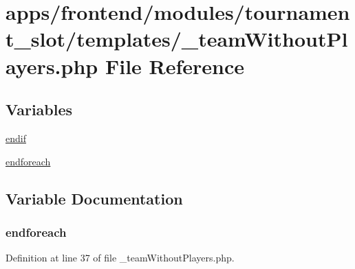 \hypertarget{frontend_2modules_2tournament__slot_2templates_2__team_without_players_8php}{\section{apps/frontend/modules/tournament\-\_\-slot/templates/\-\_\-team\-Without\-Players.php File Reference}
\label{frontend_2modules_2tournament__slot_2templates_2__team_without_players_8php}
}
\subsection*{Variables}
\begin{DoxyCompactItemize}
\item 
\hyperlink{frontend_2modules_2tournament__slot_2templates_2__team_without_players_8php_a82cd33ca97ff99f2fcc5e9c81d65251b}{endif}
\item 
\hyperlink{frontend_2modules_2tournament__slot_2templates_2__team_without_players_8php_a672d9707ef91db026c210f98cc601123}{endforeach}
\end{DoxyCompactItemize}


\subsection{Variable Documentation}
\hypertarget{frontend_2modules_2tournament__slot_2templates_2__team_without_players_8php_a672d9707ef91db026c210f98cc601123}{
\subsubsection[{endforeach}]{\setlength{\rightskip}{0pt plus 5cm}endforeach}}\label{frontend_2modules_2tournament__slot_2templates_2__team_without_players_8php_a672d9707ef91db026c210f98cc601123}


Definition at line 37 of file \-\_\-team\-Without\-Players.\-php.

